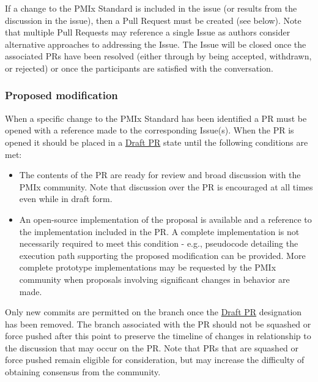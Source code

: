 \documentclass{article}
\begin{document}
If a change to the PMIx Standard is included in the issue (or results
from the discussion in the issue), then a Pull Request must be created
(see below). Note that multiple Pull Requests may reference a single
Issue as authors consider alternative approaches to addressing the
Issue. The Issue will be closed once the associated PRs have been
resolved (either through by being accepted, withdrawn, or rejected) or
once the participants are satisfied with the conversation.

\hypertarget{proposed-modification}{%
\subsubsection{Proposed modification}\label{proposed-modification}}

When a specific change to the PMIx Standard has been identified a PR
must be opened with a reference made to the corresponding Issue(s). When
the PR is opened it should be placed in a
\href{https://github.blog/2019-02-14-introducing-draft-pull-requests/}{Draft
PR} state until the following conditions are met:

\begin{itemize}
\item
  The contents of the PR are ready for review and broad discussion with
  the PMIx community. Note that discussion over the PR is encouraged at
  all times even while in draft form.
\item
  An open-source implementation of the proposal is available and a
  reference to the implementation included in the PR. A complete
  implementation is not necessarily required to meet this condition -
  e.g., pseudocode detailing the execution path supporting the proposed
  modification can be provided. More complete prototype implementations
  may be requested by the PMIx community when proposals involving
  significant changes in behavior are made.
\end{itemize}

Only new commits are permitted on the branch once the
\href{https://github.blog/2019-02-14-introducing-draft-pull-requests/}{Draft
PR} designation has been removed. The branch associated with the PR
should not be squashed or force pushed after this point to preserve the
timeline of changes in relationship to the discussion that may occur on
the PR. Note that PRs that are squashed or force pushed remain eligible
for consideration, but may increase the difficulty of obtaining
consensus from the community.
\end{document}
